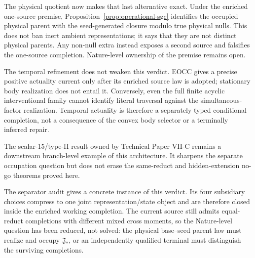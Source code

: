 \documentclass[11pt]{article}
\begin{document}
The physical quotient now makes that last alternative exact. Under the
enriched one-source premise, Proposition~\ref{prop:operational-sgc} identifies
the occupied physical parent with the seed-generated closure modulo true
physical nulls. This does not ban inert ambient representations; it says that
they are not distinct physical parents. Any non-null extra instead exposes a
second source and falsifies the one-source completion. Nature-level ownership
of the premise remains open.

The temporal refinement does not weaken this verdict.  EOCC gives a precise
positive actuality current only after its enriched source law is adopted;
stationary body realization does not entail it.  Conversely, even the full
finite acyclic interventional family cannot identify literal traversal
against the simultaneous-factor realization.  Temporal actuality is therefore
a separately typed conditional completion, not a consequence of the convex
body selector or a terminally inferred repair.

The scalar-15/type-II result owned by Technical Paper VII-C remains a
downstream branch-level example of this architecture. It sharpens the
separate occupation question but does not erase the same-reduct and
hidden-extension no-go theorems proved here.

The separator audit gives a concrete instance of this verdict.  Its four
subsidiary choices compress to one joint representation/state object and are
therefore closed inside the enriched working completion.  The current source
still admits equal-reduct completions with different mixed cross moments, so
the Nature-level question has been reduced, not solved: the physical
base--seed parent law must realize and occupy $\mathfrak J_*$, or an
independently qualified terminal must distinguish the surviving completions.




\end{document}
